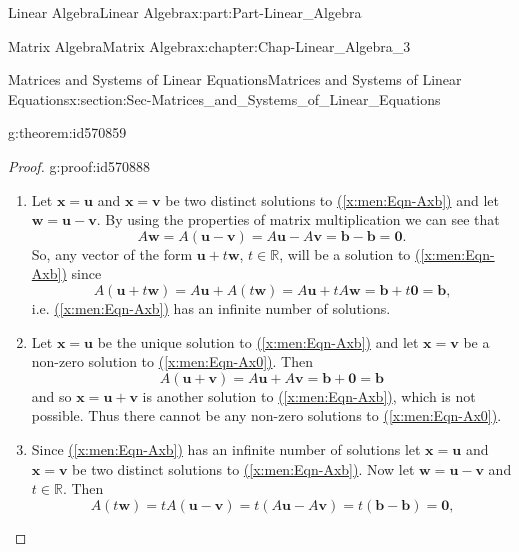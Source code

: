 \documentclass[oneside,10pt,]{book}
\newcommand{\xreffont}{\relax}
\numberwithin{equation}{section}
\begin{document}
\begin{partptx}{Linear Algebra}{}{Linear Algebra}{}{}{x:part:Part-Linear_Algebra}
\begin{chapterptx}{Matrix Algebra}{}{Matrix Algebra}{}{}{x:chapter:Chap-Linear_Algebra_3}
\begin{sectionptx}{Matrices and Systems of Linear Equations}{}{Matrices and Systems of Linear Equations}{}{}{x:section:Sec-Matrices_and_Systems_of_Linear_Equations}
\begin{theorem}{}{}{g:theorem:id570859}
\begin{enumerate}[label=(\arabic*)]
\end{enumerate}
%
\end{theorem}
\begin{proof}{}{g:proof:id570888}
%
\begin{enumerate}[label=\arabic*]
\item{}Let \(\mathbf{x} = \mathbf{u}\) and \(\mathbf{x} = \mathbf{v}\) be two distinct solutions to \hyperref[x:men:Eqn-Axb]{({\xreffont\ref{x:men:Eqn-Axb}})} and let \(\mathbf{w} = \mathbf{u} − \mathbf{v}\). By using the properties of matrix multiplication we can see that%
\begin{equation*}
A\mathbf{w} = A(\mathbf{u} − \mathbf{v}) = A\mathbf{u} − A\mathbf{v} =\mathbf{b} − \mathbf{b} = \mathbf{0}.
\end{equation*}
So, any vector of the form \(\mathbf{u} + t\mathbf{w}\), \(t \in \mathbb{R}\), will be a solution to \hyperref[x:men:Eqn-Axb]{({\xreffont\ref{x:men:Eqn-Axb}})} since%
\begin{equation*}
A(\mathbf{u} +t\mathbf{w}) = A\mathbf{u} + A(t\mathbf{w}) = A\mathbf{u} +tA\mathbf{w} = \mathbf{b} +t\mathbf{0} = \mathbf{b}\text{,}
\end{equation*}
i.e. \hyperref[x:men:Eqn-Axb]{({\xreffont\ref{x:men:Eqn-Axb}})} has an infinite number of solutions.%
\item{}Let \(\mathbf{x} = \mathbf{u}\) be the unique solution to \hyperref[x:men:Eqn-Axb]{({\xreffont\ref{x:men:Eqn-Axb}})} and let \(\mathbf{x} = \mathbf{v}\) be a non-zero solution to \hyperref[x:men:Eqn-Ax0]{({\xreffont\ref{x:men:Eqn-Ax0}})}. Then%
\begin{equation*}
A(\mathbf{u} + \mathbf{v}) = A\mathbf{u} + A\mathbf{v} = \mathbf{b} + \mathbf{0} = \mathbf{b}
\end{equation*}
and so \(\mathbf{x} = \mathbf{u} + \mathbf{v}\) is another solution to \hyperref[x:men:Eqn-Axb]{({\xreffont\ref{x:men:Eqn-Axb}})}, which is not possible. Thus there cannot be any non-zero solutions to \hyperref[x:men:Eqn-Ax0]{({\xreffont\ref{x:men:Eqn-Ax0}})}.%
\item{}Since \hyperref[x:men:Eqn-Axb]{({\xreffont\ref{x:men:Eqn-Axb}})} has an infinite number of solutions let \(\mathbf{x} = \mathbf{u}\) and \(\mathbf{x} = \mathbf{v}\) be two distinct solutions to \hyperref[x:men:Eqn-Axb]{({\xreffont\ref{x:men:Eqn-Axb}})}. Now let \(\mathbf{w} = \mathbf{u} − \mathbf{v}\) and \(t \in \mathbb{R}\). Then%
\begin{equation*}
A(t\mathbf{w}) = tA(\mathbf{u} − \mathbf{v}) = t(A\mathbf{u} − A\mathbf{v}) = t(\mathbf{b} − \mathbf{b}) = \mathbf{0}\text{,}

\end{equation*}
\end{enumerate}
\end{proof}
\end{sectionptx}
\end{chapterptx}
\end{partptx}
\end{document}
